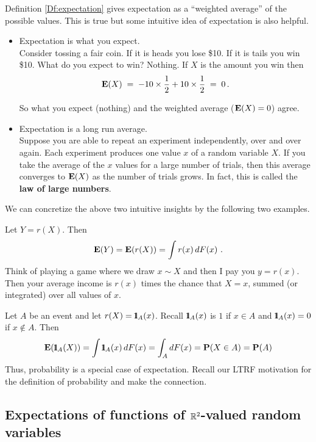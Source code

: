 Definition \ref{Df:expectation} gives expectation as a ``weighted average'' of the possible values. This is true but some intuitive idea of expectation is also helpful.
\begin{itemize}
\item Expectation is what you expect. \\[6pt]
Consider tossing a fair coin. If it is heads you lose \$10. If it is tails you win \$10. 
What do you expect to win? Nothing. 
If $X$ is the amount you win then $$\mathbf{E}(X)\;=\;-10\times \frac{1}{2}+10\times \frac{1}{2}\;=\;0\,.$$

So what you expect (nothing) and the weighted average ($\mathbf{E}(X)=0$) agree.


\item Expectation is a long run average.\\[6pt]
Suppose you are able to repeat an experiment independently, over and over again. 
Each experiment produces one value $x$ of a random variable $X$.  
If you take the average of the $x$ values for a large number of trials, then this average converges to $\mathbf{E}(X)$ as the number of trials grows.  In fact, this is called the {\bf law of large numbers}.
\end{itemize}

We can concretize the above two intuitive insights by the following two examples.

\begin{example}
Let $Y = r(X)$.  Then
\[
\mathbf{E}(Y) = \mathbf{E}(r(X)) = \int r(x)\, d F(x) \ .
\]
Think of playing a game where we draw $x \sim X$ and then I pay you $y=r(x)$.  Then your average income is $r(x)$ times the chance that $X=x$, summed (or integrated) over all values of $x$.
\end{example}

\begin{example}
Let $A$ be an event and let $r(X)={1}\mspace{-11 mu}{1}_{A}(x)$.  Recall ${1}\mspace{-11 mu}{1}_A(x)$ is $1$ if $x \in A$ and ${1}\mspace{-11 mu}{1}_A(x)=0$ if $x \notin A$.  Then
\begin{equation}\label{E:ExpectationofIndicator}
\mathbf{E}({1}\mspace{-11 mu}{1}_A(X)) = \int {1}\mspace{-11 mu}{1}_A(x)\, dF(x) = \int_A dF(x) = \mathbf{P}(X \in A) = \mathbf{P}(A)
\end{equation}
Thus, probability is a special case of expectation.  Recall our LTRF motivation for the definition of probability and make the connection.
\end{example}

\subsection*{Expectations of functions of $\mathbb{R}^2$-valued random variables}\label{S:ExpectationsOfFunsOf2RVs}

